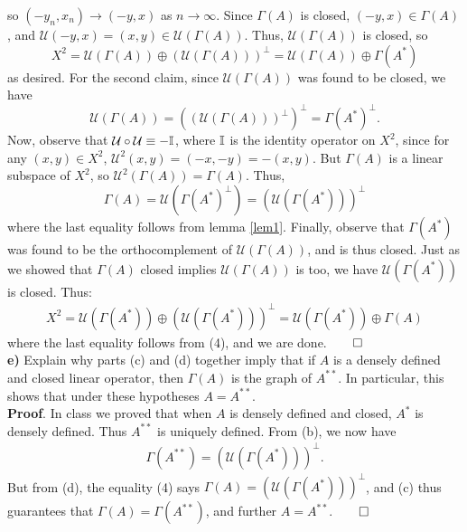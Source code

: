 \documentclass[10pt]{article}
\newcommand{\1}[1]{\mathbbm{1}_{#1}} \newcommand{\mc}[1]{\mathcal{#1}}
\begin{document}
    so $(-y_n,x_n)\rightarrow(-y,x)$ as $n\rightarrow\infty$. Since $\Gamma(A)$ is closed, $(-y,x)\in\Gamma(A)$, and $\mc{U}(-y,x)=(x,y)\in\mc{U}(\Gamma(A))$. Thus, $\mc{U}(\Gamma(A))$ is closed, so
    \[X^2=\mc{U}(\Gamma(A))\oplus(\mc{U}(\Gamma(A)))^\perp=\mc{U}(\Gamma(A))\oplus\Gamma(A^\ast)\]
    as desired. For the second claim, since $\mc{U}(\Gamma(A))$ was found to be closed, we have
    \[\mc{U}(\Gamma(A))=((\mc{U}(\Gamma(A)))^\perp)^\perp=\Gamma(A^\ast)^\perp.\]
    Now, observe that $\mc{U}\circ\mc{U}\equiv-\mbb{I}$, where $\mathbb{I}$ is the identity operator on $X^2$, since for any $(x,y)\in X^2$, $\mc{U}^2(x,y)=(-x,-y)=-(x,y)$.
    But $\Gamma(A)$ is a linear subspace of $X^2$, so $\mc{U}^2(\Gamma(A))=\Gamma(A)$. Thus,
    \[\Gamma(A)=\mc{U}(\Gamma(A^\ast)^\perp)=(\mc{U}(\Gamma(A^\ast)))^\perp\tag{4}\]
    where the last equality follows from lemma \ref{lem1}. Finally, observe that $\Gamma(A^\ast)$ was found to be the orthocomplement of $\mc{U}(\Gamma(A))$, and is thus closed. Just as we showed that $\Gamma(A)$ closed implies $\mc{U}(\Gamma(A))$ is too, we have
    $\mc{U}(\Gamma(A^\ast))$ is closed. Thus:
    \begin{align*}
        X^2=\mc{U}(\Gamma(A^\ast))\oplus(\mc{U}(\Gamma(A^\ast)))^\perp=\mc{U}(\Gamma(A^\ast))\oplus\Gamma(A)
    \end{align*}
    where the last equality follows from (4), and we are done.\hfill{$\qed$}\\[5pt]
    {\bf e)} Explain why parts (c) and (d) together imply that if $A$ is a densely defined and closed linear operator, then $\Gamma(A)$ is the graph of $A^{\ast\ast}$. In particular, this shows that under these hypotheses $A=A^{\ast\ast}$.\\[5pt]
    {\bf Proof}. In class we proved that when $A$ is densely defined and closed, $A^\ast$ is densely defined. Thus $A^{\ast\ast}$ is uniquely defined. From (b), we now have
    \begin{align*}
        \Gamma(A^{\ast\ast})=(\mc{U}(\Gamma(A^\ast)))^\perp.
    \end{align*}
    But from (d), the equality (4) says $\Gamma(A)=(\mc{U}(\Gamma(A^\ast)))^\perp$, and (c) thus guarantees that $\Gamma(A)=\Gamma(A^{\ast\ast})$, and further $A=A^{\ast\ast}$.\hfill{$\qed$}\\[5pt]
\end{document}
